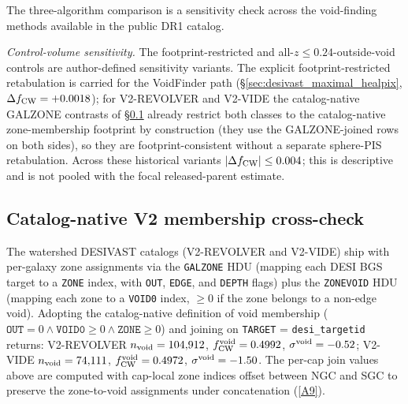 \documentclass[twocolumn,linenumbers]{aastex702}
\newcommand{\repoBase}{https://github.com/Hubify-Projects/bigbounce/blob/main}
\begin{document}
The three-algorithm comparison is a sensitivity check across the
void-finding methods available in the public DR1 catalog.

\emph{Control-volume sensitivity.} The footprint-restricted and
all-$z\le0.24$-outside-void controls are author-defined sensitivity
variants. The explicit footprint-restricted retabulation is
carried for the VoidFinder path
(\S\ref{sec:desivast_maximal_healpix}, $\Delta f_{\rm CW} = +0.0018$);
for V2-REVOLVER and V2-VIDE the catalog-native GALZONE contrasts of
\S\ref{sec:desivast_catalog_native} already restrict both classes to the
catalog-native zone-membership footprint by construction (they use the
GALZONE-joined rows on both sides), so they are footprint-consistent
without a separate sphere-PIS retabulation. Across these historical
variants $|\Delta f_{\rm CW}| \le 0.004$; this is descriptive and is
not pooled with the focal released-parent estimate.

\subsection{Catalog-native V2 membership cross-check}\label{sec:desivast_catalog_native}

The watershed
DESIVAST catalogs (V2-REVOLVER and V2-VIDE) ship with per-galaxy zone
assignments via the \texttt{GALZONE} HDU (mapping each DESI BGS target
to a \texttt{ZONE} index, with \texttt{OUT}, \texttt{EDGE}, and
\texttt{DEPTH} flags) plus the \texttt{ZONEVOID} HDU (mapping each
zone to a \texttt{VOID0} index, $\geq 0$ if the zone belongs to a
non-edge void). Adopting the catalog-native definition of void
membership ($\texttt{OUT} = 0 \wedge \texttt{VOID0} \geq 0 \wedge
\texttt{ZONE} \geq 0$) and joining on \texttt{TARGET} =
\texttt{desi\_targetid} returns: V2-REVOLVER $n_{\rm void} = 104{,}912$,
$f_{\rm CW}^{\rm void} = 0.4992$, $\sigma^{\rm void} = -0.52$; V2-VIDE
$n_{\rm void} = 74{,}111$, $f_{\rm CW}^{\rm void} = 0.4972$,
$\sigma^{\rm void} = -1.50$. The per-cap join values above are computed
with cap-local zone indices offset between NGC and SGC to preserve the
zone-to-void assignments under concatenation
(\href{\repoBase/pipelines/p5\_desi\_chirality/outputs/22\_r24conf\_local\_batch.json}{[A9]}).
\end{document}
